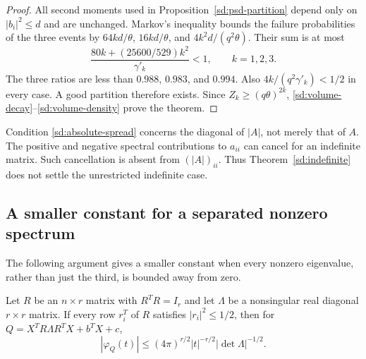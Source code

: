 \begin{proof}
All second moments used in Proposition~\ref{sd:psd-partition}
depend only on $|b_i|^2\leq d$ and are unchanged.
Markov's inequality bounds the failure probabilities of the
three events by
$64kd/\theta$, $16kd/\theta$, and $4k^2d/(q^2\theta)$.
Their sum is at most
\[
 \frac{80k+(25600/529)k^2}{\gamma'_k}<1,\qquad k=1,2,3.
\]
The three ratios are less than $0.988$, $0.983$, and $0.994$.
Also $4k/(q^2\gamma'_k)<1/2$ in every case.
A good partition therefore exists.  Since $Z_k\geq(q\theta)^{2k}$,
\eqref{sd:volume-decay}--\eqref{sd:volume-density}
prove the theorem.
\end{proof}

\begin{remark}\label{sd:scope}
Condition \eqref{sd:absolute-spread} concerns the diagonal of
$|A|$, not merely that of $A$.  The positive and negative spectral
contributions to $a_{ii}$ can cancel for an indefinite matrix.
Such cancellation is absent from $(|A|)_{ii}$.
Thus Theorem~\ref{sd:indefinite} does not settle the unrestricted
indefinite case.
\end{remark}

\subsection{A smaller constant for a separated nonzero spectrum}
The following argument gives a smaller constant when every nonzero
eigenvalue, rather than just the third, is bounded away from zero.

\begin{lemma}\label{sd:frame}
Let $R$ be an $n\times r$ matrix with $R^TR=I_r$ and let
$\Lambda$ be a nonsingular real diagonal $r\times r$ matrix.
If every row $r_i^T$ of $R$ satisfies $|r_i|^2\leq1/2$, then
for $Q=X^TR\Lambda R^TX+b^TX+c$,
\begin{equation}\label{sd:frame-fourier}
 |\varphi_Q(t)|
 \leq(4\pi)^{r/2}|t|^{-r/2}|\det\Lambda|^{-1/2}.
\end{equation}
\end{lemma}

